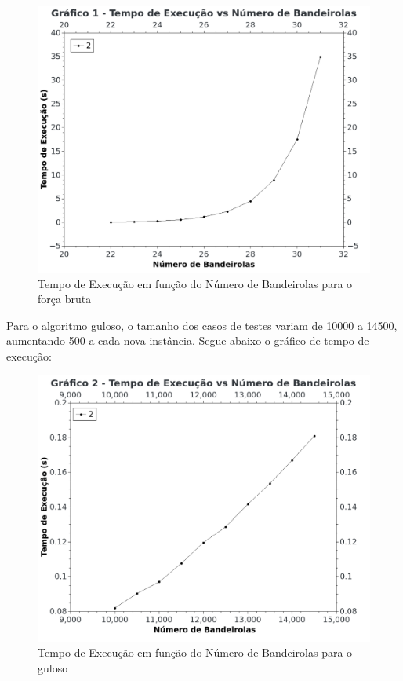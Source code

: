 \documentclass[
	12pt,
	a4paper,
	onepage,
	brazil
]{article}
\begin{document}
	\begin{figure}[H]
		\centering
		\includegraphics[scale=2]{brute_force_graph.png}
		\caption{Tempo de Execução em função do Número de Bandeirolas para o força bruta}
	\end{figure}

	Para o algoritmo guloso, o tamanho dos casos de testes variam de 10000 a 14500, aumentando 500 a cada nova instância. Segue abaixo o gráfico de tempo de execução:
	
	\begin{figure}[H]
		\centering
		\includegraphics[scale=2]{greedy_graph.png}
		\caption{Tempo de Execução em função do Número de Bandeirolas para o guloso}
	\end{figure}
	
\end{document}
